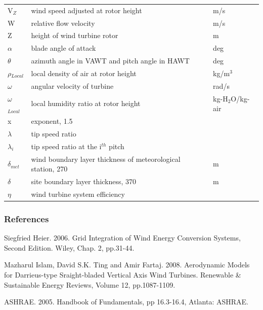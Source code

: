 \begin{longtable}[c]{p{1.2in}p{3.3in}p{1.5in}}
V\(_{Z}\) & wind speed adjusted at rotor height & m/s \tabularnewline
W & relative flow velocity & m/s \tabularnewline
Z & height of wind turbine rotor & m \tabularnewline
$\alpha$ & blade angle of attack & deg \tabularnewline
$\theta$ & azimuth angle in VAWT and pitch angle in HAWT & deg \tabularnewline
$\rho$\(_{Local}\) & local density of air at rotor height & kg/m\(^{3}\) \tabularnewline
$\omega$ & angular velocity of turbine & rad/s \tabularnewline
$\omega$\(_{Local}\) & local humidity ratio at rotor height & kg-H\(_{2}\)O/kg-air \tabularnewline
x & exponent, 1.5 & ~ \tabularnewline
$\lambda$ & tip speed ratio & ~ \tabularnewline
$\lambda$\(_{i}\) & tip speed ratio at the i\(^{th}\) pitch & ~ \tabularnewline
$\delta$\(_{met}\) & wind boundary layer thickness of meteorological station, 270 & m \tabularnewline
$\delta$ & site boundary layer thickness, 370 & m \tabularnewline
$\eta$ & wind turbine system efficiency & ~ \tabularnewline
\bottomrule
\end{longtable}

\subsubsection{References}\label{references-3-002}

Siegfried Heier. 2006. Grid Integration of Wind Energy Conversion Systems, Second Edition. Wiley, Chap. 2, pp.31-44.

Mazharul Islam, David S.K. Ting and Amir Fartaj. 2008. Aerodynamic Models for Darrieus-type Sraight-bladed Vertical Axis Wind Turbines. Renewable \& Sustainable Energy Reviews, Volume 12, pp.1087-1109.

ASHRAE. 2005. Handbook of Fundamentals, pp 16.3-16.4, Atlanta: ASHRAE.
